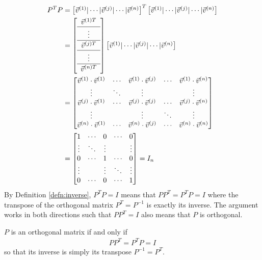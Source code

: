 \begin{align*}
P^TP &= 
\begin{bmatrix}
\vec{v}^{(1)}|\cdots|\vec{v}^{(j)}|\cdots|\vec{v}^{(n)}   
\end{bmatrix}^T
\begin{bmatrix}
\vec{v}^{(1)}|\cdots|\vec{v}^{(j)}|\cdots|\vec{v}^{(n)}   
\end{bmatrix} \\
&= 
\left[
\begin{array}{c}
\vec{v}^{(1)T}\\
\hline
\vdots \\
\hline
\vec{v}^{(j)T} \Tstrut \\
\hline
\vdots \\
\hline
\vec{v}^{(n)T} \Tstrut 
\end{array}
\right]
\begin{bmatrix}
\vec{v}^{(1)}|\cdots|\vec{v}^{(j)}|\cdots|\vec{v}^{(n)}
\end{bmatrix} \\ 
&=
\begin{bmatrix}
\vec{v}^{(1)} \cdot \vec{v}^{(1)} & \cdots & \vec{v}^{(1)} \cdot \vec{v}^{(j)} & \cdots & \vec{v}^{(1)} \cdot \vec{v}^{(n)} \\
\vdots & \ddots & \vdots & & \vdots \\
\vec{v}^{(j)} \cdot \vec{v}^{(1)} & \cdots & \vec{v}^{(j)} \cdot \vec{v}^{(j)} & \cdots & \vec{v}^{(j)} \cdot \vec{v}^{(n)} \\
\vdots & & \vdots & \ddots & \vdots \\
\vec{v}^{(n)} \cdot \vec{v}^{(1)} & \cdots & \vec{v}^{(n)} \cdot \vec{v}^{(j)} & \cdots & \vec{v}^{(n)} \cdot \vec{v}^{(n)}
\end{bmatrix} \\
&=
\begin{bmatrix}
1 & \cdots & 0 & \cdots & 0 \\
\vdots & \ddots & \vdots & & \vdots \\
0 & \cdots & 1 & \cdots & 0 \\
\vdots & & \vdots & \ddots & \vdots \\
0 & \cdots & 0 & \cdots & 1
\end{bmatrix} = I_n
\end{align*}
By Definition \ref{defn:inverse}, $P^TP = I$ means that $PP^T = P^TP = I$ where the transpose of the orthogonal matrix $P^T = P^{-1}$ is exactly its inverse. The argument works in both directions such that $PP^T = I$ also means that $P$ is orthogonal.
\begin{proper}
\label{proper:orthoinvT}
$P$ is an orthogonal matrix if and only if 
\begin{align}
PP^T = P^TP = I \label{eqn:orthomatPPT}
\end{align} so that its inverse is simply its transpose $P^{-1} = P^T$.
\end{proper}
